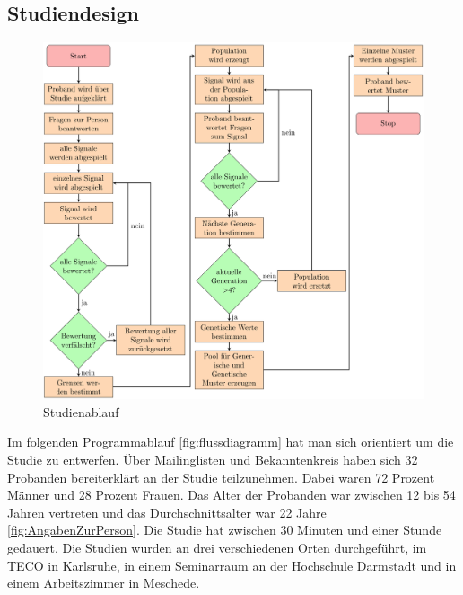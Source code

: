 

\subsection{Studiendesign}

\begin{figure}
	\centering
    \includegraphics[width=\textwidth]{pics/analyse/Programmablaufdiagramm.png}
    \caption{Studienablauf}
    \label{fig:flussdiagramm}
\end{figure}

Im folgenden Programmablauf \autoref{fig:flussdiagramm} hat man sich orientiert um die Studie zu entwerfen. {\"U}ber Mailinglisten und Bekanntenkreis haben sich 32 Probanden bereiterkl{\"a}rt an der Studie teilzunehmen. Dabei waren 72 Prozent M{\"a}nner und 28 Prozent Frauen. Das Alter der Probanden war zwischen 12 bis 54 Jahren vertreten und das Durchschnittsalter war 22 Jahre \autoref{fig:AngabenZurPerson}.  
Die Studie hat zwischen 30 Minuten und einer Stunde gedauert.
Die Studien wurden an drei verschiedenen Orten durchgef{\"u}hrt, im TECO in Karlsruhe, in einem Seminarraum an der Hochschule Darmstadt und in einem Arbeitszimmer in Meschede.

